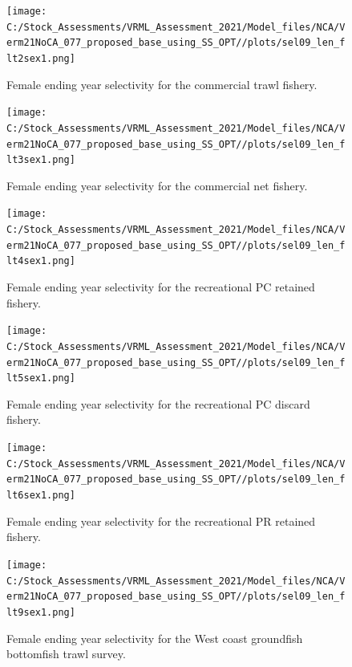 \documentclass[
  english,
  a4paper,
]{article}
\begin{document}
\begin{figure}
\centering
\texttt{[image: C:/Stock\_Assessments/VRML\_Assessment\_2021/Model\_files/NCA/Verm21NoCA\_077\_proposed\_base\_using\_SS\_OPT//plots/sel09\_len\_flt2sex1.png]}
\caption{Female ending year selectivity for the commercial trawl fishery.\label{fig:endyr-selex-COM-TWL}}
\end{figure}

\begin{figure}
\centering
\texttt{[image: C:/Stock\_Assessments/VRML\_Assessment\_2021/Model\_files/NCA/Verm21NoCA\_077\_proposed\_base\_using\_SS\_OPT//plots/sel09\_len\_flt3sex1.png]}
\caption{Female ending year selectivity for the commercial net fishery.\label{fig:endyr-selex-COM-NET}}
\end{figure}

\begin{figure}
\centering
\texttt{[image: C:/Stock\_Assessments/VRML\_Assessment\_2021/Model\_files/NCA/Verm21NoCA\_077\_proposed\_base\_using\_SS\_OPT//plots/sel09\_len\_flt4sex1.png]}
\caption{Female ending year selectivity for the recreational PC retained fishery.\label{fig:endyr-selex-REC-PC}}
\end{figure}

\begin{figure}
\centering
\texttt{[image: C:/Stock\_Assessments/VRML\_Assessment\_2021/Model\_files/NCA/Verm21NoCA\_077\_proposed\_base\_using\_SS\_OPT//plots/sel09\_len\_flt5sex1.png]}
\caption{Female ending year selectivity for the recreational PC discard fishery.\label{fig:endyr-selex-REC-PC-DIS}}
\end{figure}

\begin{figure}
\centering
\texttt{[image: C:/Stock\_Assessments/VRML\_Assessment\_2021/Model\_files/NCA/Verm21NoCA\_077\_proposed\_base\_using\_SS\_OPT//plots/sel09\_len\_flt6sex1.png]}
\caption{Female ending year selectivity for the recreational PR retained fishery.\label{fig:endyr-selex-REC-PR}}
\end{figure}

\begin{figure}
\centering
\texttt{[image: C:/Stock\_Assessments/VRML\_Assessment\_2021/Model\_files/NCA/Verm21NoCA\_077\_proposed\_base\_using\_SS\_OPT//plots/sel09\_len\_flt9sex1.png]}
\caption{Female ending year selectivity for the West coast groundfish bottomfish trawl survey.\label{fig:endyr-selex-NWFSC-TWL}}
\end{figure}
\end{document}
